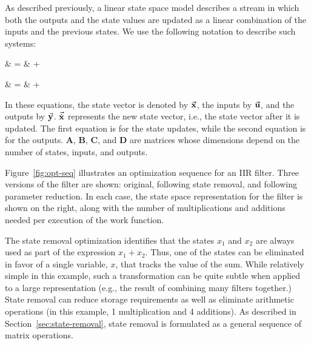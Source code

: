

As described previously, a linear state space model describes a stream
in which both the outputs and the state values are updated as a linear
combination of the inputs and the previous states.  We use the
following notation to describe such systems:

\hspace{0.5in}\begin{minipage}{2.5in}
\starteqnstar 
{} & = &  +
 \
\doneeqnstar
\end{minipage}
\begin{minipage}{2.5in}
\starteqnstar 
{}
& = &  + 
\doneeqnstar
\end{minipage}

\noindent In these equations, the state vector is denoted by
$\vec{\mathbf{x}}$, the inputs by $\vec{\mathbf{u}}$, and the outputs
by $\vec{\mathbf{y}}$. $\vec{\dot{\mathbf{x}}}$ represents the new
state vector, i.e., the state vector after it is updated. The first
equation is for the state updates, while the second equation is for the
outputs.  $\mathbf{A}$, $\mathbf{B}$, $\mathbf{C}$, and
$\mathbf{D}$ are matrices whose dimensions depend on the number of
states, inputs, and outputs.

Figure~\ref{fig:opt-seq} illustrates an optimization sequence for an
IIR filter.  Three versions of the filter are shown: original,
following state removal, and following parameter reduction.  In each
case, the state space representation for the filter is shown on the
right, along with the number of multiplications and additions needed
per execution of the work function.

The state removal optimization identifies that the states $x_1$ and
$x_2$ are always used as part of the expression $x_1 + x_2$.  Thus,
one of the states can be eliminated in favor of a single variable,
$x$, that tracks the value of the sum.  While relatively simple in
this example, such a transformation can be quite subtle when applied
to a large representation (e.g., the result of combining many filters
together.)  State removal can reduce storage requirements as well as
eliminate arithmetic operations (in this example, 1 multiplication and
4 additions).  As described in Section~\ref{sec:state-removal}, state
removal is formulated as a general sequence of matrix operations.

